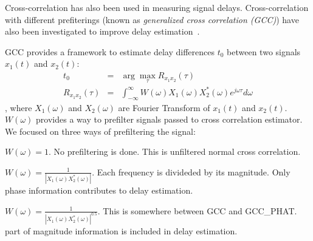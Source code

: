 Cross-correlation has also been used in measuring signal delays\cite{tdoa:mit2, tdoa:micloc, tdoa:3}. Cross-correlation with different prefiterings (known as \emph{generalized cross correlation (GCC)}) have also been investigated to improve delay estimation~\cite{tdoa:gcc1,tdoa:gcc2,tdoa:gcc3}.

GCC provides a framework to estimate delay differences $t_0$ between two signals $x_1(t)$ and $x_2(t)$:
\begin{eqnarray} \label{eq:gcc}
t_0 &=& \arg\max_{\tau} R_{x_1x_2}(\tau) \\\label{eq:gcc2}
R_{x_1x_2}(\tau) &=& \int_{-\infty}^\infty W(\omega) X_1(\omega) X_2^{*}(\omega) e^{j\omega\tau} d\omega
\end{eqnarray}
, where $X_1(\omega)$ and $X_2(\omega)$ are Fourier Transform of $x_1(t)$ and $x_2(t)$. $W(\omega)$ provides a way to prefilter signals passed to cross correlation estimator. We focused on three ways of prefiltering the signal:
\begin{description}
\item[GCC] $W(\omega) = 1$. No prefiltering is done. This is unfiltered normal cross correlation.
\item[GCC\_PHAT] $W(\omega) = \frac{1}{\left|X_1(\omega)X_2^{*}(\omega)\right|}$. Each frequency is divideded by its magnitude. Only phase information contributes to delay estimation.
\item[GCC\_PHAT\_SQRT] $W(\omega) = \frac{1}{\left|X_1(\omega)X_2^*(\omega)\right|^{0.5}}$. This is somewhere between GCC and GCC\_PHAT. part of magnitude information is included in delay estimation.
\end{description}
